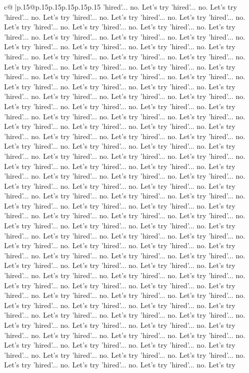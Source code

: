 \documentclass{article}
\begin{document}
{\begin{supertabular}{c@{$\;$}|p{.15\linewidth}@{}p{.15\linewidth}p{.15\linewidth}p{.15\linewidth}p{.15\linewidth}p{.15\linewidth}}
{{{'hired'... no. Let's try 'hired'... no. Let's try 'hired'... no. Let's try 'hired'... no. Let's try 'hired'... no. Let's try 'hired'... no. Let's try 'hired'... no. Let's try 'hired'... no. Let's try 'hired'... no. Let's try 'hired'... no. Let's try 'hired'... no. Let's try 'hired'... no. Let's try 'hired'... no. Let's try 'hired'... no. Let's try 'hired'... no. Let's try 'hired'... no. Let's try 'hired'... no. Let's try 'hired'... no. Let's try 'hired'... no. Let's try 'hired'... no. Let's try 'hired'... no. Let's try 'hired'... no. Let's try 'hired'... no. Let's try 'hired'... no. Let's try 'hired'... no. Let's try 'hired'... no. Let's try 'hired'... no. Let's try 'hired'... no. Let's try 'hired'... no. Let's try 'hired'... no. Let's try 'hired'... no. Let's try 'hired'... no. Let's try 'hired'... no. Let's try 'hired'... no. Let's try 'hired'... no. Let's try 'hired'... no. Let's try 'hired'... no. Let's try 'hired'... no. Let's try 'hired'... no. Let's try 'hired'... no. Let's try 'hired'... no. Let's try 'hired'... no. Let's try 'hired'... no. Let's try 'hired'... no. Let's try 'hired'... no. Let's try 'hired'... no. Let's try 'hired'... no. Let's try 'hired'... no. Let's try 'hired'... no. Let's try 'hired'... no. Let's try 'hired'... no. Let's try 'hired'... no. Let's try 'hired'... no. Let's try 'hired'... no. Let's try 'hired'... no. Let's try 'hired'... no. Let's try 'hired'... no. Let's try 'hired'... no. Let's try 'hired'... no. Let's try 'hired'... no. Let's try 'hired'... no. Let's try 'hired'... no. Let's try 'hired'... no. Let's try 'hired'... no. Let's try 'hired'... no. Let's try 'hired'... no. Let's try 'hired'... no. Let's try 'hired'... no. Let's try 'hired'... no. Let's try 'hired'... no. Let's try 'hired'... no. Let's try 'hired'... no. Let's try 'hired'... no. Let's try 'hired'... no. Let's try 'hired'... no. Let's try 'hired'... no. Let's try 'hired'... no. Let's try 'hired'... no. Let's try 'hired'... no. Let's try 'hired'... no. Let's try 'hired'... no. Let's try 'hired'... no. Let's try 'hired'... no. Let's try 'hired'... no. Let's try 'hired'... no. Let's try 'hired'... no. Let's try 'hired'... no. Let's try 'hired'... no. Let's try 'hired'... no. Let's try 'hired'... no. Let's try 'hired'... no. Let's try 'hired'... no. Let's try 'hired'... no. Let's try 'hired'... no. Let's try 'hired'... no. Let's try 'hired'... no. Let's try 'hired'... no. Let's try 'hired'... no. Let's try 'hired'... no. Let's try 'hired'... no. Let's try 'hired'... no. Let's try 'hired'... no. Let's try 'hired'... no. Let's try 'hired'... no. Let's try 'hired'... no. Let's try 'hired'... no. Let's try 'hired'... no. Let's try 'hired'... no. Let's try 'hired'... no. Let's try 'hired'... no. Let's try 'hired'... no. Let's try 'hired'... no. Let's try 'hired'... no. Let's try 'hired'... no. Let's try 'hired'... no. Let's try 'hired'... no. Let's try 'hired'... no. Let's try 'hired'... no. Let's try 'hired'... no. Let's try 'hired'... no. Let's try 'hired'... no. Let's try 'hired'... no. Let's try 'hired'... no. Let's try 'hired'... no. Let's try 'hired'... no. Let's try 'hired'... no. Let's try 'hired'... no. Let's try 'hired'... no. Let's try }}}
\end{supertabular}}
\end{document}
